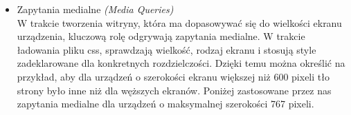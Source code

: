 \begin{itemize}
          \item Zapytania medialne \emph{(Media Queries)}\\
            W trakcie tworzenia witryny, która ma dopasowywać się do wielkości ekranu urządzenia, kluczową rolę odgrywają zapytania medialne. W trakcie ładowania pliku css, sprawdzają wielkość, rodzaj ekranu i stosują style zadeklarowane dla konkretnych rozdzielczości. Dzięki temu można określić na przykład, aby dla urządzeń o szerokości ekranu większej niż 600 pixeli tło strony było inne niż dla węższych ekranów.
            Poniżej zastosowane przez nas zapytania medialne dla urządzeń o maksymalnej szerokości 767 pixeli.
            \begin{code}
              
            \end{code}\\
        \end{itemize}

